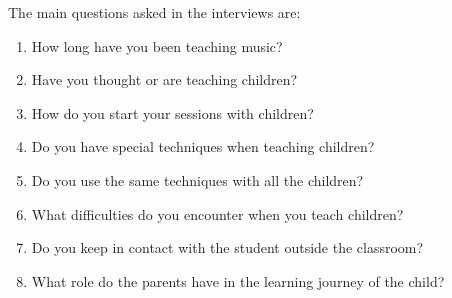 The main questions asked in the interviews are:
\begin{enumerate}
    \item How long have you been teaching music?
    \item Have you thought or are teaching children?
    \item How do you start your sessions with children?
    \item Do you have special techniques when teaching children?
    \item Do you use the same techniques with all the children?
    \item What difficulties do you encounter when you teach children?
    \item Do you keep in contact with the student outside the classroom?
    \item What role do the parents have in the learning journey of the child?
\end{enumerate}

